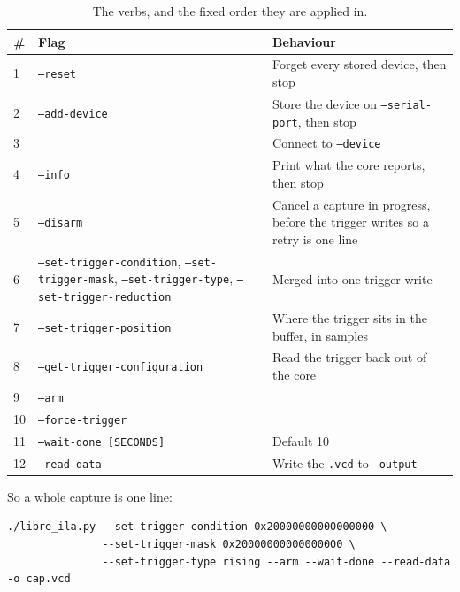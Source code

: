 \documentclass[../manual.tex]{subfiles}
\begin{document}
\begin{table}[H]
    \centering
    \begin{tabularx}{\textwidth}{|l|>{\raggedright\arraybackslash}X|>{\raggedright\arraybackslash}X|}
        \hline
        \rowcolor{gray!40} \textbf{\#} & \textbf{Flag} & \textbf{Behaviour} \\
        \hline
        1 & \texttt{--reset} & Forget every stored device, then stop \\
        \hline
        2 & \texttt{--add-device} & Store the device on \texttt{--serial-port}, then stop \\
        \hline
        3 & & Connect to \texttt{--device} \\
        \hline
        4 & \texttt{--info} & Print what the core reports, then stop \\
        \hline
        5 & \texttt{--disarm} & Cancel a capture in progress, before the trigger writes so a retry is one line \\
        \hline
        6 & \texttt{--set-trigger-condition}, \texttt{--set-trigger-mask}, \texttt{--set-trigger-type}, \texttt{--set-trigger-reduction} & Merged into one trigger write \\
        \hline
        7 & \texttt{--set-trigger-position} & Where the trigger sits in the buffer, in samples \\
        \hline
        8 & \texttt{--get-trigger-configuration} & Read the trigger back out of the core \\
        \hline
        9 & \texttt{--arm} & \\
        \hline
        10 & \texttt{--force-trigger} & \\
        \hline
        11 & \texttt{--wait-done [SECONDS]} & Default 10 \\
        \hline
        12 & \texttt{--read-data} & Write the \texttt{.vcd} to \texttt{--output} \\
        \hline
    \end{tabularx}
    \caption{The verbs, and the fixed order they are applied in.}
    \label{tab:cli_order}
\end{table}

So a whole capture is one line:

\begin{lstlisting}
./libre_ila.py --set-trigger-condition 0x20000000000000000 \
               --set-trigger-mask 0x20000000000000000 \
               --set-trigger-type rising --arm --wait-done --read-data -o cap.vcd
\end{lstlisting}
\end{document}
